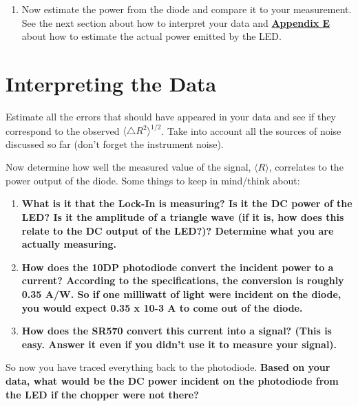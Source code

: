 \documentclass{../lab}
\begin{document}
\begin{enumerate}
    \item Now estimate the power from the diode and compare it to your measurement. See the next section about how to interpret your data and \href{http://experimentationlab.berkeley.edu/node/100}{\textbf{Appendix E}} about how to estimate the actual power emitted by the LED.

\end{enumerate}

\section{Interpreting the Data}

Estimate all the errors that should have appeared in your data and see if they correspond to the observed $\langle \triangle R^2 \rangle^{1/2}$. Take into account all the sources of noise discussed so far (don't forget the instrument noise).

Now determine how well the measured value of the signal, $\langle  R \rangle$, correlates to the power output of the diode. Some things to keep in mind/think about:

\begin{enumerate}
    \item \textbf{What is it that the Lock-In is measuring? Is it the DC power of the LED? Is it the amplitude of a triangle wave (if it is, how does this relate to the DC output of the LED?)? Determine what you are actually measuring.}

    \item \textbf{How does the 10DP photodiode convert the incident power to a current? According to the specifications, the conversion is roughly 0.35 A/W. So if one milliwatt of light were incident on the diode, you would expect 0.35 x 10-3 A to come out of the diode. }

    \item \textbf{How does the SR570 convert this current into a signal? (This is easy. Answer it even if you didn't use it to measure your signal).}

\end{enumerate}

So now you have traced everything back to the photodiode. \textbf{Based on your data, what would be the DC power incident on the photodiode from the LED if the chopper were not there?}
\end{document}
